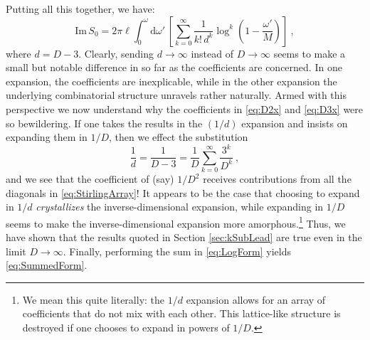 \documentclass[a4paper,11pt]{article}
\newcommand{\dd}[1]{\text{d}#1 \, }
\newcommand{\im}{\text{Im} \,}
\begin{document}
Putting all this together, we have:
\begin{equation}
\label{eq:LogForm}
\im S_0 = 2\pi \ell \int_{0}^{\omega} \dd{\omega'} \left[ \sum_{k=0}^{\infty} \frac{1}{k! \, d^k} \log^{k} \left( 1-\frac{\omega'}{M}\right) \right]\ ,
\end{equation}
where $d = D-3$. Clearly, sending $d \rightarrow \infty$ instead of $D \rightarrow \infty$ seems to make a small but notable difference in so far as the coefficients are concerned. In one expansion, the coefficients are inexplicable, while in the other expansion the underlying combinatorial structure unravels rather naturally. Armed with this perspective we now understand why the coefficients in \eqref{eq:D2x} and \eqref{eq:D3x} were so bewildering. If one takes the results in the $(1/d)$ expansion and insists on expanding them in $1/D$, then we effect the substitution
\begin{equation}
\frac{1}{d} = \frac{1}{D-3} = \frac{1}{D} \sum_{k = 0}^{\infty} \frac{3^k}{D^k} \ ,
\end{equation}
and we see that the coefficient of (say) $1/D^2$ receives contributions from all the diagonals in \eqref{eq:StirlingArray}! It appears to be the case that choosing to expand in $1/d$ \emph{crystallizes} the inverse-dimensional expansion, while expanding in $1/D$ seems to make the inverse-dimensional expansion more amorphous.\footnote{We mean this quite literally: the $1/d$ expansion allows for an array of coefficients that do not mix with each other. This lattice-like structure is destroyed if one chooses to expand in powers of $1/D$.} Thus, we have shown that the results quoted in Section \ref{sec:kSubLead} are true even in the limit $D \rightarrow \infty$. Finally, performing the sum in \eqref{eq:LogForm} yields \eqref{eq:SummedForm}.




\end{document}
